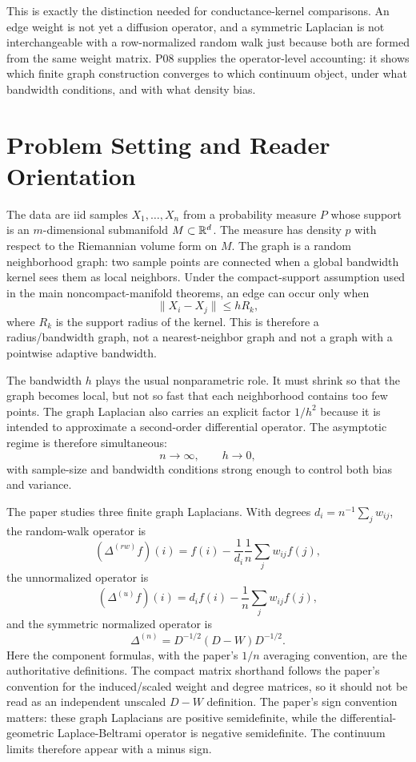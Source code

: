 \documentclass[11pt]{article}
\begin{document}
This is exactly the distinction needed for conductance-kernel comparisons.
An edge weight is not yet a diffusion operator, and a symmetric Laplacian is
not interchangeable with a row-normalized random walk just because both are
formed from the same weight matrix.  P08 supplies the operator-level
accounting: it shows which finite graph construction converges to which
continuum object, under what bandwidth conditions, and with what density
bias.

\section{Problem Setting and Reader Orientation}

The data are iid samples $X_1,\ldots,X_n$ from a probability measure $P$ whose
support is an $m$-dimensional submanifold $M \subset \mathbb{R}^d$.  The measure has
density $p$ with respect to the Riemannian volume form on $M$.  The graph is a
random neighborhood graph: two sample points are connected when a global
bandwidth kernel sees them as local neighbors.  Under the compact-support
assumption used in the main noncompact-manifold theorems, an edge can occur
only when
\[
  \|X_i-X_j\| \le h R_k,
\]
where $R_k$ is the support radius of the kernel.  This is therefore a
radius/bandwidth graph, not a nearest-neighbor graph and not a graph with a
pointwise adaptive bandwidth.

The bandwidth $h$ plays the usual nonparametric role.  It must shrink so that
the graph becomes local, but not so fast that each neighborhood contains too
few points.  The graph Laplacian also carries an explicit factor $1/h^2$
because it is intended to approximate a second-order differential operator.
The asymptotic regime is therefore simultaneous:
\[
  n \to \infty, \qquad h \to 0,
\]
with sample-size and bandwidth conditions strong enough to control both bias
and variance.

The paper studies three finite graph Laplacians.  With degrees
$d_i = n^{-1}\sum_j w_{ij}$, the random-walk operator is
\[
  (\Delta^{(rw)} f)(i)
  =
  f(i)-\frac{1}{d_i}\frac{1}{n}\sum_j w_{ij} f(j),
\]
the unnormalized operator is
\[
  (\Delta^{(u)} f)(i)
  =
  d_i f(i)-\frac{1}{n}\sum_j w_{ij} f(j),
\]
and the symmetric normalized operator is
\[
  \Delta^{(n)}
  =
  D^{-1/2}(D-W)D^{-1/2}.
\]
Here the component formulas, with the paper's \(1/n\) averaging convention,
are the authoritative definitions. The compact matrix shorthand follows the
paper's convention for the induced/scaled weight and degree matrices, so it
should not be read as an independent unscaled \(D-W\) definition.
The paper's sign convention matters: these graph Laplacians are positive
semidefinite, while the differential-geometric Laplace-Beltrami operator is
negative semidefinite.  The continuum limits therefore appear with a minus
sign.
\end{document}
